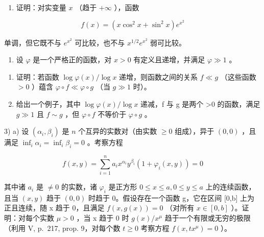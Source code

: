 \begin{enumerate}
\def\labelenumi{\arabic{enumi})}
\tightlist
\item
  证明：对实变量 \(x\) （趋于 \(+\infty\) ），函数
\end{enumerate}

\[
f (x) = \left(x \cos^ {2} x + \sin^ {2} x\right) e ^ {x ^ {2}}
\]

单调，但它既不与 \(e^{x^2}\) 可比较，也不与 \(x^{1/2}e^{x^2}\) 弱可比较。

\begin{enumerate}
\def\labelenumi{\arabic{enumi})}
\setcounter{enumi}{1}
\tightlist
\item
  设 \(\varphi\) 是一个严格正的函数，对 \(x > 0\) 有定义且递增，并满足 \(\varphi \gg 1\) 。
\end{enumerate}

\begin{enumerate}
\def\labelenumi{\alph{enumi})}
\item
  证明：若函数 \(\log \varphi(x) / \log x\) 递增，则函数之间的关系 \(f \ll g\) （这些函数 \(>0\) ）蕴含 \(\varphi \circ f \ll \varphi \circ g\) （当 \(g \gg 1\) 时）。
\item
  给出一个例子，其中 \(\log \varphi(x)/\log x\) 递减，f 与 g 是两个 \textgreater0 的函数，满足 \(g \gg 1\) 且 \(f \sim g\) ，但 \(\varphi \circ f\) 不等价于 \(\varphi \circ g\) 。
\end{enumerate}

3) a) 设 \((\alpha_{i},\beta_{i})\) 是 \(n\) 个互异的实数对（由实数 \(\geqslant 0\) 组成），异于 \((0,0)\) ，且满足 \(\inf_{i}\alpha_{i} = \inf_{i}\beta_{i} = 0\) 。考察方程

\[
f (x, y) = \sum_ {i = 1} ^ {n} a _ {i} x ^ {\alpha_ {i}} y ^ {\beta_ {i}} \left(1 + \varphi_ {i} (x, y)\right) = 0
\]

其中诸 \(a_{i}\) 是 \(\neq0\) 的实数，诸 \(\varphi_{i}\) 是正方形 \(0\leqslant x\leqslant a,0\leqslant y\leqslant a\) 上的连续函数，且当 \((x,y)\) 趋于 \((0,0)\) 时趋于 0。假设存在一个函数 g，它在区间 {[}0,b{]} 上为正且连续，随 x 趋于 0，且满足 \(f(x,g(x))=0\) （对所有 \(x\in[0,b]\) ）。证明：对每个实数 \(\mu>0\) ，当 x 趋于 0 时 \(g(x)/x^{\mu}\) 趋于一个有限或无穷的极限（利用 V, p.~217, prop. 9，对每个数 \(t\geqslant0\) 考察方程 \(f(x,tx^{\mu})=0\) ）。

